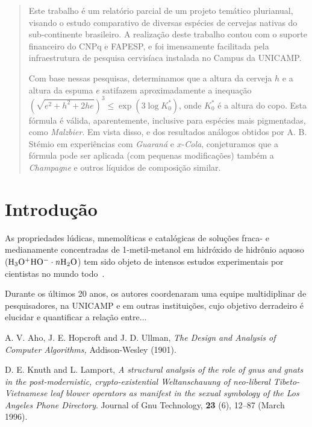 \documentclass[11pt,twoside]{article}
\begin{document}

    \begin{abstract}
        Este trabalho é um relatório parcial de um projeto temático
        plurianual, visando o estudo comparativo de diversas espécies de
        cervejas nativas do sub-continente brasileiro.  A realização deste
        trabalho contou com o suporte financeiro do CNPq e FAPESP, e foi
        imensamente facilitada pela infraestrutura de pesquisa cervisíaca
        instalada no Campus da UNICAMP.

        Com base nessas pesquisas, determinamos que a altura da cerveja $h$
        e a altura da espuma $e$ satifazem aproximadamente a inequação
        $(\sqrt{e^2 + h^2 + 2 h e})^3 \leq \exp(3 \log K_0^\ast)$, onde
        $K_0^\ast$ é a altura do copo.  Esta fórmula é válida,
        aparentemente, inclusive para espécies mais pigmentadas, como {\em
        Malzbier}.  Em vista disso, e dos resultados análogos obtidos por
        A. B. Stémio em experiências com {\em Guaraná} e $x$-{\em Cola},
        conjeturamos que a fórmula pode ser aplicada (com pequenas
        modificações) também a {\em Champagne} e outros líquidos de
        composição similar.
    \end{abstract}

    \section{Introdução}

    As propriedades lúdicas, mnemolíticas e catalógicas de
    soluções fraca- e medianamente concentradas de 1-metil-metanol
    em hidróxido de hidrônio aquoso ($\rm H_3O^{+} HO^{-}\cdot {\mathit n}H_2O$)
    tem sido objeto de intensos estudos experimentais por
    cientistas no mundo todo~\cite{AHU,KNU}.

    Durante os últimos 20 anos, os autores coordenaram uma equipe
    multidiplinar de pesquisadores, na UNICAMP e em outras instituições,
    cujo objetivo derradeiro é elucidar e quantificar a relação entre...

    \begin{thebibliography}{99}
         A. V. Aho, J. E. Hopcroft and J.  D.  Ullman, {\it The
        Design and Analysis of Computer Algorithms,} Addison-Wesley (1901).

         D. E. Knuth and L. Lamport, {\it A structural analysis
        of the role of gnus and gnats in the post-modernistic, crypto-existential
        Weltanschauung of neo-liberal Tibeto-Vietnamese leaf blower operators
        as manifest in the sexual symbology of the Los Angeles Phone Directory}.
        Journal of Gnu Technology, {\bf 23} (6), 12--87
        (March 1996).
    \end{thebibliography}
\end{document}
